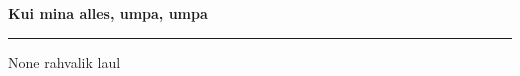 \documentclass[10pt]{book}
\begin{document}
{
  \samepage
  \raggedbottom
  \raggedright
  \sloppy


  \vspace{0.2in}

  \noindent\begin{minipage}{.1\textwidth}
    \hfill\vspace{0.1in}
  \end{minipage}%
  \noindent\begin{minipage}{.8\textwidth}
    \centering
    \bfseries
    \large Kui mina alles, umpa, umpa
  \end{minipage}%
  \noindent\begin{minipage}{.1\textwidth}
      \hfill\vspace{0.1in}
  \end{minipage}

  \nopagebreak[4]
  \vspace{0.1in}
  \nopagebreak[4]
  \hrule height 0.05ex
  \nopagebreak[4]
  \vspace{-0.05in}

  {\footnotesize None \hfill rahvalik laul }\\
  \vspace{0.01in}



}
\end{document}
